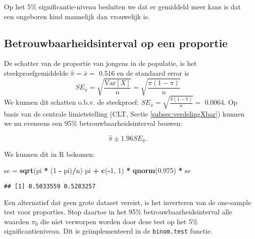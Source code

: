 \documentclass[12pt,dutch,coursenotes]{book}
\newenvironment{Shaded}{\begin{snugshade}}{\end{snugshade}}
\newcommand{\KeywordTok}[1]{\textcolor[rgb]{0.13,0.29,0.53}{\textbf{#1}}}
\newcommand{\DataTypeTok}[1]{\textcolor[rgb]{0.13,0.29,0.53}{#1}}
\newcommand{\DecValTok}[1]{\textcolor[rgb]{0.00,0.00,0.81}{#1}}
\newcommand{\FloatTok}[1]{\textcolor[rgb]{0.00,0.00,0.81}{#1}}
\newcommand{\StringTok}[1]{\textcolor[rgb]{0.31,0.60,0.02}{#1}}
\newcommand{\OperatorTok}[1]{\textcolor[rgb]{0.81,0.36,0.00}{\textbf{#1}}}
\newcommand{\NormalTok}[1]{#1}
\theoremstyle{definition}
\theoremstyle{definition}
\theoremstyle{definition}
\theoremstyle{remark}
\begin{document}
Op het 5\% significantie-niveau besluiten we dat er gemiddeld meer kans
is dat een ongeboren kind mannelijk dan vrouwelijk is.

\subsection{Betrouwbaarheidsinterval op een
proportie}\label{betrouwbaarheidsinterval-op-een-proportie}

De schatter van de proportie van jongens in de populatie, is het
steekproefgemiddelde \(\hat \pi=\bar x=\) 0.516 en de standaard error is
\[SE_{\bar x}=\sqrt{\frac{\text{Var}[X]}{n}}=\sqrt{\frac{\pi(1-\pi)}{n}}\]
We kunnen dit schatten o.b.v. de steekproef:
\(SE_{\bar x}=\sqrt{\frac{\hat\pi(1-\hat\pi)}{n}}=\) 0.0064. Op basis
van de centrale limietstelling (CLT, Sectie \ref{subsec:verdelingXbar})
kunnen we nu eveneens een 95\% betrouwbaarheidsinterval bouwen:

\[\hat\pi \pm 1.96 SE_{\hat\pi}.\]

We kunnen dit in R bekomen:

\begin{Shaded}
\begin{Highlighting}[]
\NormalTok{se =}\StringTok{ }\KeywordTok{sqrt}\NormalTok{(pi }\OperatorTok{*}\StringTok{ }\NormalTok{(}\DecValTok{1} \OperatorTok{-}\StringTok{ }\NormalTok{pi)}\OperatorTok{/}\NormalTok{n)}
\NormalTok{pi }\OperatorTok{+}\StringTok{ }\KeywordTok{c}\NormalTok{(}\OperatorTok{-}\DecValTok{1}\NormalTok{, }\DecValTok{1}\NormalTok{) }\OperatorTok{*}\StringTok{ }\KeywordTok{qnorm}\NormalTok{(}\FloatTok{0.975}\NormalTok{) }\OperatorTok{*}\StringTok{ }\NormalTok{se}
\end{Highlighting}
\end{Shaded}

\begin{verbatim}
## [1] 0.5033559 0.5283257
\end{verbatim}

Een alternatief dat geen grote dataset vereist, is het inverteren van de
one-sample test voor proporties. Stop daartoe in het 95\%
betrouwbaarheidsinterval alle waarden \(\pi_0\) die niet verworpen
worden door deze test op het 5\% significantieniveau. Dit is
geïmplementeerd in de \texttt{binom.test} functie.

\begin{Shaded}
\end{Shaded}
\end{document}
